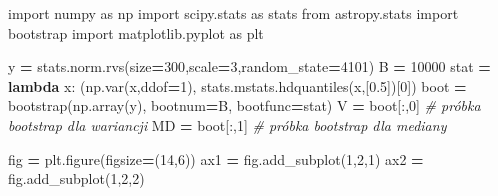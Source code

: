 \documentclass[polish,]{book}
\newenvironment{Shaded}{\begin{snugshade}}{\end{snugshade}}
\newcommand{\CommentTok}[1]{\textcolor[rgb]{0.56,0.35,0.01}{\textit{#1}}}
\newcommand{\DecValTok}[1]{\textcolor[rgb]{0.00,0.00,0.81}{#1}}
\newcommand{\FloatTok}[1]{\textcolor[rgb]{0.00,0.00,0.81}{#1}}
\newcommand{\ImportTok}[1]{#1}
\newcommand{\KeywordTok}[1]{\textcolor[rgb]{0.13,0.29,0.53}{\textbf{#1}}}
\newcommand{\NormalTok}[1]{#1}
\newcommand{\OperatorTok}[1]{\textcolor[rgb]{0.81,0.36,0.00}{\textbf{#1}}}
\begin{document}
\begin{Shaded}
\begin{Highlighting}[]
\ImportTok{import}\NormalTok{ numpy }\ImportTok{as}\NormalTok{ np}
\ImportTok{import}\NormalTok{ scipy.stats }\ImportTok{as}\NormalTok{ stats}
\ImportTok{from}\NormalTok{ astropy.stats }\ImportTok{import}\NormalTok{ bootstrap}
\ImportTok{import}\NormalTok{ matplotlib.pyplot }\ImportTok{as}\NormalTok{ plt}

\NormalTok{y }\OperatorTok{=}\NormalTok{ stats.norm.rvs(size}\OperatorTok{=}\DecValTok{300}\NormalTok{,scale}\OperatorTok{=}\DecValTok{3}\NormalTok{,random_state}\OperatorTok{=}\DecValTok{4101}\NormalTok{)}
\NormalTok{B }\OperatorTok{=} \DecValTok{10000}
\NormalTok{stat }\OperatorTok{=} \KeywordTok{lambda}\NormalTok{ x: (np.var(x,ddof}\OperatorTok{=}\DecValTok{1}\NormalTok{), stats.mstats.hdquantiles(x,[}\FloatTok{0.5}\NormalTok{])[}\DecValTok{0}\NormalTok{])}
\NormalTok{boot }\OperatorTok{=}\NormalTok{ bootstrap(np.array(y), bootnum}\OperatorTok{=}\NormalTok{B, bootfunc}\OperatorTok{=}\NormalTok{stat)}
\NormalTok{V  }\OperatorTok{=}\NormalTok{ boot[:,}\DecValTok{0}\NormalTok{] }\CommentTok{# próbka bootstrap dla wariancji}
\NormalTok{MD }\OperatorTok{=}\NormalTok{ boot[:,}\DecValTok{1}\NormalTok{] }\CommentTok{# próbka bootstrap dla mediany}

\NormalTok{fig }\OperatorTok{=}\NormalTok{ plt.figure(figsize}\OperatorTok{=}\NormalTok{(}\DecValTok{14}\NormalTok{,}\DecValTok{6}\NormalTok{))}
\NormalTok{ax1 }\OperatorTok{=}\NormalTok{ fig.add_subplot(}\DecValTok{1}\NormalTok{,}\DecValTok{2}\NormalTok{,}\DecValTok{1}\NormalTok{)}
\NormalTok{ax2 }\OperatorTok{=}\NormalTok{ fig.add_subplot(}\DecValTok{1}\NormalTok{,}\DecValTok{2}\NormalTok{,}\DecValTok{2}\NormalTok{)}


\end{Highlighting}
\end{Shaded}
\end{document}
